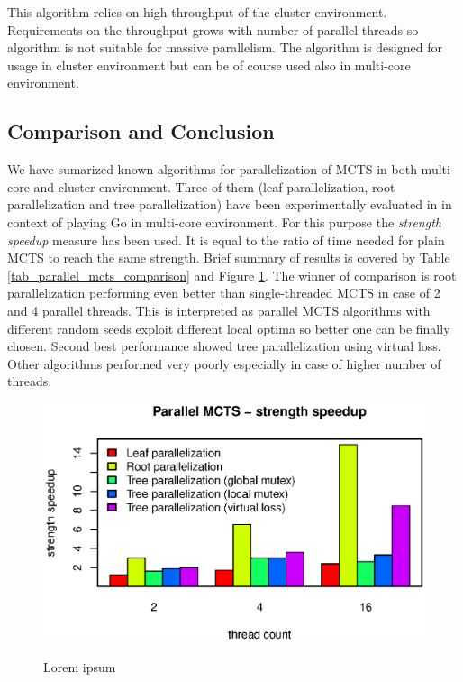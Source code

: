 This algorithm relies on high throughput of the cluster environment. Requirements on the throughput
grows with number of parallel threads so algorithm is not suitable for massive parallelism. The
algorithm is designed for usage in cluster environment but can be of course used also in multi-core
environment.


\subsection{Comparison and Conclusion}
\label{sec_parallel_mcts_comparison}

We have sumarized known algorithms for parallelization of MCTS in both multi-core and cluster
environment. Three of them (leaf parallelization, root parallelization and tree
parallelization)
have been experimentally evaluated in \cite{Chaslot2008} in context of playing Go in multi-core
environment. For this purpose the \emph{strength speedup} measure has been used. It is equal to
 the ratio of time needed for plain
MCTS to reach the same strength. Brief summary of results is covered by Table
\ref{tab_parallel_mcts_comparison} and Figure \ref{fig_parallel_mcts_comparison}. The winner of comparison is root parallelization performing even
better than single-threaded MCTS in case of 2 and 4 parallel threads. This is interpreted as 
parallel MCTS algorithms with different random seeds exploit different local optima so better one
can be finally chosen. Second best performance showed tree parallelization using virtual loss. Other
algorithms performed very poorly especially in case of higher number of threads.

\begin{figure}
\begin{center}
\includegraphics{img/parallel-mcts.eps}
\end{center}
\caption{\footnotesize Lorem ipsum}{\footnotesize }
\label{fig_parallel_mcts_comparison}
\end{figure}

